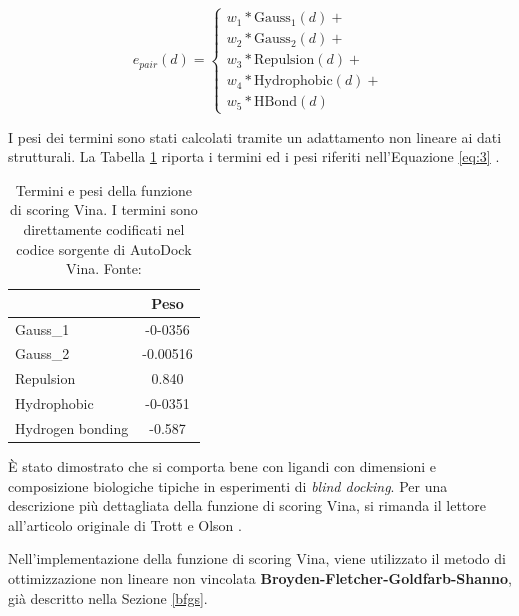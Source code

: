 \begin{equation} \label{eq:3}
    e_{pair}(d) = 
    \begin{cases}
        w_1 * \text{Gauss}_1(d) +\\
        w_2 * \text{Gauss}_2(d) +\\
        w_3 * \text{Repulsion}(d) +\\
        w_4 * \text{Hydrophobic}(d) +\\
        w_5 * \text{HBond}(d)
    \end{cases}
\end{equation} 

I pesi dei termini sono stati calcolati tramite un adattamento non lineare ai dati strutturali. La Tabella \ref{vina_weights} riporta i termini ed i pesi riferiti nell'Equazione \ref{eq:3} \cite{quiroga_vinardo_2016}.

\begin{table}[H] 
\centering
\begin{tabular}{|l|c|}
\hline
\rowcolor[HTML]{C0C0C0} 
\multicolumn{1}{|c|}{\cellcolor[HTML]{C0C0C0}\textbf{Termine}} & \textbf{Peso} \\ \hline
Gauss\_1                                                       & -0-0356       \\ \hline
Gauss\_2                                                       & -0.00516      \\ \hline
Repulsion                                                      & 0.840         \\ \hline
Hydrophobic                                                    & -0-0351       \\ \hline
Hydrogen bonding                                               & -0.587        \\ \hline
\end{tabular}
\caption[Termini e pesi della funzione di scoring Vina.]{Termini e pesi della funzione di scoring Vina. I termini sono direttamente codificati nel codice sorgente di AutoDock Vina. Fonte: \cite{trott_autodock_2009}}
\label{vina_weights}
\end{table}

È stato dimostrato che si comporta bene con ligandi con dimensioni e composizione biologiche tipiche in esperimenti di \textit{blind docking}.
Per una descrizione più dettagliata della funzione di scoring Vina, si rimanda il lettore all'articolo originale di Trott e Olson \cite{trott_autodock_2009, quiroga_vinardo_2016}.

Nell'implementazione della funzione di scoring Vina, viene utilizzato il metodo di ottimizzazione non lineare non vincolata \textbf{Broyden-Fletcher-Goldfarb-Shanno}, già descritto nella Sezione \ref{bfgs}.


